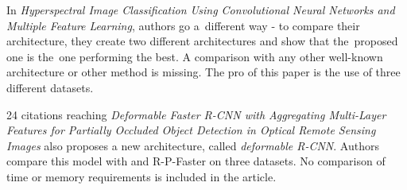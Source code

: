 In \textit{Hyperspectral Image Classification Using Convolutional Neural Networks and Multiple Feature Learning}, authors go a~different way - to compare their architecture, they create two different architectures and show that the~proposed one is the~one performing the best. A comparison with any other well-known architecture or other  method is missing. The pro of this paper is the use of three different datasets.

24 citations reaching \textit{Deformable Faster R-CNN with Aggregating Multi-Layer Features for Partially Occluded Object Detection in Optical Remote Sensing Images} also proposes a new architecture, called \textit{deformable R-CNN}. Authors compare this model with  and R-P-Faster  \cite{rp-faster-rcnn} on three datasets. No comparison of time or memory requirements is included in the article.








